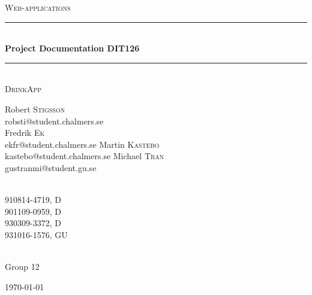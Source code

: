 \documentclass[a4paper]{article}
\title{}
\author{Robert Stigsson -- 910814-4719, \\Fredrik Ek -- 901109-0959, \\Martin Kastebo -- 930309-3372, \\Michael Tran -- 931016-1576}
\date{\today}
\newcommand{\HRule}{\rule{\linewidth}{0.5mm}}
\begin{document}
\begin{titlepage}

\begin{center}



\textsc{\LARGE Web-applications}\\[1.5cm]




\HRule \\[0.4cm]
{ \huge \bfseries Project Documentation DIT126}\\
\HRule \\[0.5cm]

\textsc{\Large DrinkApp}\\[0.4cm]


\begin{minipage}{0.4\textwidth}
\begin{flushleft} \large
Robert \textsc{Stigsson}\\
robsti@student.chalmers.se\\[0.4cm]
Fredrik \textsc{Ek}\\
ekfr@student.chalmers.se
Martin \textsc{Kastebo}\\
kastebo@student.chalmers.se
Michael \textsc{Tran}\\
gustranmi@student.gu.se

\end{flushleft}
\end{minipage}
\begin{minipage}{0.4\textwidth}
\begin{flushright} \large
\emph{} \\
910814-4719, \textsc{D}\\[0.8cm]
901109-0959, \textsc{D}\\[0.8cm]
930309-3372, \textsc{D}\\[0.8cm]
931016-1576, \textsc{GU}\\[0.8cm]


\end{flushright}
\end{minipage}\\[2.0cm]
Group 12
\vfill

{\large \today}

\end{center}

\end{titlepage}
\end{document}
